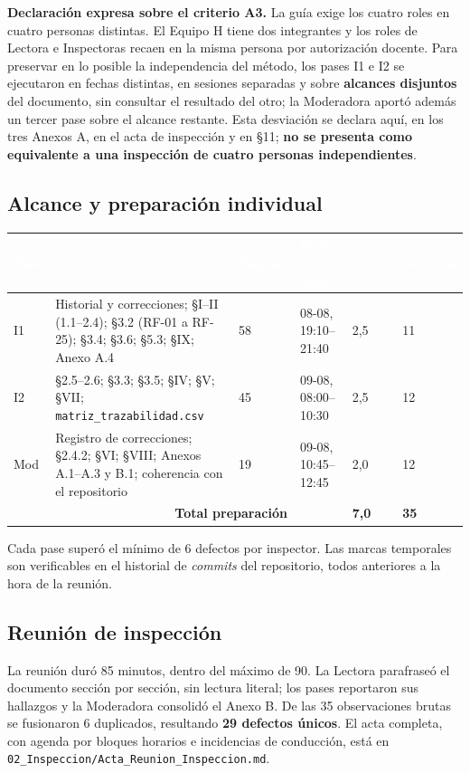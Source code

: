 \documentclass[11pt,letterpaper]{article}
\newcommand{\thead}[1]{\cellcolor{uteqverde}\textcolor{white}{\textbf{#1}}}
\begin{document}
\textbf{Declaración expresa sobre el criterio A3.} La guía exige los cuatro roles en cuatro personas distintas. El Equipo H tiene dos integrantes y los roles de Lectora e Inspectoras recaen en la misma persona por autorización docente. Para preservar en lo posible la independencia del método, los pases I1 e I2 se ejecutaron en fechas distintas, en sesiones separadas y sobre \textbf{alcances disjuntos} del documento, sin consultar el resultado del otro; la Moderadora aportó además un tercer pase sobre el alcance restante. Esta desviación se declara aquí, en los tres Anexos A, en el acta de inspección y en \S11; \textbf{no se presenta como equivalente a una inspección de cuatro personas independientes}.

\subsection{Alcance y preparación individual}

\begin{center}
\small
\begin{tabular}{|p{1.4cm}|p{6.6cm}|p{1.5cm}|p{2.2cm}|p{1.6cm}|p{1.4cm}|}
\hline
\thead{Pase} & \thead{Alcance} & \thead{Páginas} & \thead{Fecha y hora} & \thead{Horas} & \thead{Defectos} \\ \hline
I1 & Historial y correcciones; \S I--II (1.1--2.4); \S3.2 (RF-01 a RF-25); \S3.4; \S3.6; \S5.3; \S IX; Anexo A.4 & 58 & 08-08, 19:10--21:40 & 2,5 & 11 \\ \hline
I2 & \S2.5--2.6; \S3.3; \S3.5; \S IV; \S V; \S VII; \texttt{matriz\_trazabilidad.csv} & 45 & 09-08, 08:00--10:30 & 2,5 & 12 \\ \hline
Mod & Registro de correcciones; \S2.4.2; \S VI; \S VIII; Anexos A.1--A.3 y B.1; coherencia con el repositorio & 19 & 09-08, 10:45--12:45 & 2,0 & 12 \\ \hline
\multicolumn{3}{|r|}{\textbf{Total preparación}} & & \textbf{7,0} & \textbf{35} \\ \hline
\end{tabular}
\end{center}

Cada pase superó el mínimo de 6 defectos por inspector. Las marcas temporales son verificables en el historial de \emph{commits} del repositorio, todos anteriores a la hora de la reunión.

\subsection{Reunión de inspección}
La reunión duró 85 minutos, dentro del máximo de 90. La Lectora parafraseó el documento sección por sección, sin lectura literal; los pases reportaron sus hallazgos y la Moderadora consolidó el Anexo B. De las 35 observaciones brutas se fusionaron 6 duplicados, resultando \textbf{29 defectos únicos}. El acta completa, con agenda por bloques horarios e incidencias de conducción, está en \texttt{02\_Inspeccion/Acta\_Reunion\_Inspeccion.md}.
\end{document}
